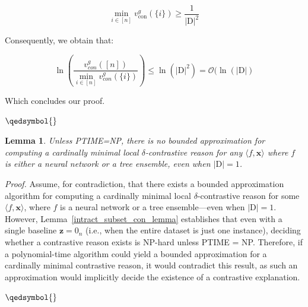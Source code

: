 \documentclass{article}
\newtheorem{lemma}{Lemma}
\newcommand{\z}{\textbf{z}}
\newcommand{\x}{\textbf{x}}
\begin{document}
\begin{equation}
    \min_{i \in [n]} v^g_{\text{con}}(\{i\})\geq \frac{1}{|\text{D}|^2}
\end{equation}

Consequently, we obtain that:


\begin{equation}
\ln\left(\frac{v^g_{con}([n])}{\min_{i \in [n]} v^g_{con}(\{i\})}\right)\leq 
\ln(|\text{D}|^2)=\mathcal{O}(\ln(|\text{D}|)
\end{equation}

Which concludes our proof.

$\qedsymbol{}$








\begin{lemma}
\label{no_bounded_approx_con_lemma}
    Unless PTIME=NP, there is no bounded approximation for computing a cardinally minimal local $\delta$-contrastive reason for any $\langle f,\x\rangle$ where $f$ is either a neural network or a tree ensemble, even when $|\text{D}|=1$. 
\end{lemma}

\emph{Proof.} Assume, for contradiction, that there exists a bounded approximation algorithm for computing a cardinally minimal local $\delta$-contrastive reason for some $\langle f,\x\rangle$, where $f$ is a neural network or a tree ensemble—even when $|\text{D}| = 1$. However, Lemma~\ref{intract_subset_con_lemma} establishes that even with a single baseline $\z = 0_n$ (i.e., when the entire dataset is just one instance), deciding whether a contrastive reason exists is NP-hard unless PTIME = NP. Therefore, if a polynomial-time algorithm could yield a bounded approximation for a cardinally minimal contrastive reason, it would contradict this result, as such an approximation would implicitly decide the existence of a contrastive explanation.

$\qedsymbol{}$


\end{document}
